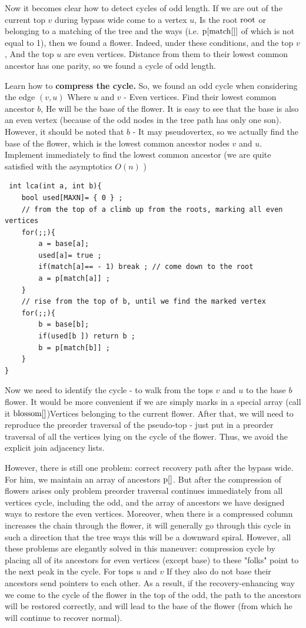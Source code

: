 Now it becomes clear how to detect cycles of odd length. If we are out of the current top $v$ during bypass wide come to a vertex $u$, Is the root $\rm root$ or belonging to a matching of the tree and the ways (i.e. $\rm p [match []]$ of which is not equal to 1), then we found a flower. Indeed, under these conditions, and the top $v$, And the top $u$ are even vertices. Distance from them to their lowest common ancestor has one parity, so we found a cycle of odd length.

Learn how to \textbf{compress the cycle.} So, we found an odd cycle when considering the edge $(v, u)$ Where $u$ and $v$ - Even vertices. Find their lowest common ancestor $b$, He will be the base of the flower. It is easy to see that the base is also an even vertex (because of the odd nodes in the tree path has only one son). However, it should be noted that $b$ - It may pseudovertex, so we actually find the base of the flower, which is the lowest common ancestor nodes $v$ and $u$. Implement immediately to find the lowest common ancestor (we are quite satisfied with the asymptotics $O (n)$ )

\begin{verbatim}
 int lca(int a, int b){
    bool used[MAXN]= { 0 } ;
    // from the top of a climb up from the roots, marking all even vertices
    for(;;){
        a = base[a];
        used[a]= true ;
        if(match[a]== - 1) break ; // come down to the root
        a = p[match[a]] ;
    }
    // rise from the top of b, until we find the marked vertex
    for(;;){
        b = base[b];
        if(used[b ]) return b ;
        b = p[match[b]] ;
    }
} 
\end{verbatim}
Now we need to identify the cycle - to walk from the tops $v$ and $u$ to the base $b$ flower. It would be more convenient if we are simply marks in a special array (call it $\rm blossom []$)Vertices belonging to the current flower. After that, we will need to reproduce the preorder traversal of the pseudo-top - just put in a preorder traversal of all the vertices lying on the cycle of the flower. Thus, we avoid the explicit join adjacency lists.

However, there is still one problem: correct recovery path after the bypass wide. For him, we maintain an array of ancestors $\rm p []$. But after the compression of flowers arises only problem preorder traversal continues immediately from all vertices cycle, including the odd, and the array of ancestors we have designed ways to restore the even vertices. Moreover, when there is a compressed column increases the chain through the flower, it will generally go through this cycle in such a direction that the tree ways this will be a downward spiral. However, all these problems are elegantly solved in this maneuver: compression cycle by placing all of its ancestors for even vertices (except base) to these "folks" point to the next peak in the cycle. For tops $u$ and $v$ If they also do not base their ancestors send pointers to each other. As a result, if the recovery-enhancing way we come to the cycle of the flower in the top of the odd, the path to the ancestors will be restored correctly, and will lead to the base of the flower (from which he will continue to recover normal).

